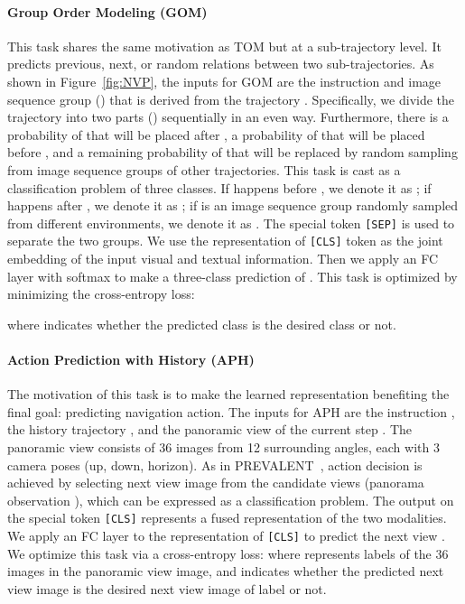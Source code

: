 \documentclass[10pt,twocolumn,letterpaper]{article}
\begin{document}
\vspace{-8pt}
\paragraph{Group Order Modeling (GOM)} 
This task shares the same motivation as TOM but at a sub-trajectory level. It  predicts previous, next, or random relations between two sub-trajectories. 
As shown in Figure~\ref{fig:NVP}, the inputs for GOM are the instruction  and image sequence group () that is derived from the trajectory . 
Specifically, we divide the trajectory into two parts () sequentially in an even way.
Furthermore, there is a probability of  that  will be placed after ,  a probability of  that  will be placed before , and a remaining  probability of  that  will be replaced by random sampling from image sequence groups of other trajectories. 
This task is cast as a classification problem of three classes.
If  happens before , we denote it as ; if  happens after , we denote it as ; if  is an image sequence group randomly sampled from different environments, we denote it as . 
The special token \texttt{[SEP]} is used to separate the two groups.
We use the representation of \texttt{[CLS]} token as the joint embedding of the input visual and textual information. Then we apply an FC layer with softmax  to make a three-class prediction of . This task is optimized by minimizing the cross-entropy loss:
{\small

}where  indicates whether the predicted class  is the desired class  or not.

\vspace{-5pt}
\paragraph{Action Prediction with History (APH)}
The motivation of this task is to make the learned representation benefiting the final goal: predicting navigation action. 
The inputs for APH are the instruction , the history trajectory , and the panoramic view  of the current step .
The panoramic view consists of 36 images from 12 surrounding angles, each with 3 camera poses (up, down, horizon).
As in PREVALENT~\cite{prevalent}, action decision is achieved by selecting next view image  from the candidate views (\ie panorama observation ), which can be expressed as a classification problem.
The output on the special token \texttt{[CLS]} represents a fused representation of the two modalities. We apply an FC layer to the representation of \texttt{[CLS]} to predict the next view .
We optimize this task via a cross-entropy loss:
{\small
}where  represents labels of the 36 images in the panoramic view image, and  indicates whether the predicted next view image  is the desired next view image of label  or not.
\end{document}
